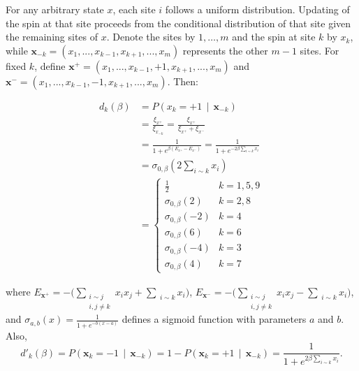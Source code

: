 \documentclass[twoside]{article}
\begin{document}
For any arbitrary state $x$, each site $i$ follows a uniform distribution. Updating of the spin at that site proceeds from the conditional distribution of that site given the remaining sites of $x$. Denote the sites by $1,\ldots,m$ and the spin at site $k$ by $x_k$, while ${\boldsymbol{x}}_{-k}=\left( x_1,...,x_{k-1},x_{k+1},...,x_m \right)$ represents the other $m-1$ sites. For fixed $k$, define ${\boldsymbol{x}}^+=\left( x_1,...,x_{k-1},+1, x_{k+1},...,x_m \right)$ and ${\boldsymbol{x}}^-=\left(x_1,...,x_{k-1},-1,x_{k+1},...,x_m \right)$. Then:
\begin{small}
\begin{align*}
d_k(\beta) &= P\left( x_k = +1 \,\middle|\, \boldsymbol{x}_{-k} \right) \\
&= \frac{\xi_{x^+}}{\xi_{x_{-k}}} = \frac{\xi_{x^+}}{\xi_{x^+} + \xi_{x^-}} \\
&=\frac{1}{1 + e^{\beta \left( E_{x^+} - E_{x^-} \right)}} = \frac{1}{1 + e^{-2\beta \sum\nolimits_{i \sim k} x_i}} \\
&= {\sigma }_{0 ,\beta} (2\sum\nolimits_{i \sim k} x_i) \\
&= \begin{cases}
    \frac{1}{2} & k = 1, 5, 9 \\
   {\sigma }_{0 ,\beta}(2) & k = 2, 8 \\
     {\sigma }_{0 ,\beta}(-2) & k = 4 \\
      {\sigma }_{0 ,\beta}(6) & k = 6 \\
     {\sigma }_{0 ,\beta}(-4) & k = 3 \\
     {\sigma }_{0 ,\beta}(4) & k = 7
\end{cases}
\end{align*}
\end{small}
where ${{E}_{{{\boldsymbol{x}}^{+}}}}=-\Big( \sum\nolimits_{\begin{smallmatrix} i\sim j \\ i,j\ne k \end{smallmatrix}}^{{}}{{{x}_{i}}{{x}_{j}}}+\sum\nolimits_{\,\,\,i\sim k}{{{x}_{i}}} \Big)$, ${{E}_{{{\boldsymbol{x}}^{-}}}}=-\Big( \sum\nolimits_{\begin{smallmatrix} i\sim j \\ i,j\ne k \end{smallmatrix}}^{{}}{{{x}_{i}}{{x}_{j}}}-\sum\nolimits_{\,\,\,i\sim k}{{{x}_{i}}} \Big)$, and ${\sigma }_{a ,b }( x )=\frac{1}{1+{{e}^{-b ( x-a )}}}$ defines a sigmoid function with parameters $a$ and $b$. Also,
\[d'_k(\beta) = P\left( \boldsymbol{x}_k = -1 \,\middle|\, \boldsymbol{x}_{-k} \right) = 1 - P\left(\boldsymbol{x}_k = +1 \,\middle|\, \boldsymbol{x}_{-k} \right) = \frac{1}{1 + e^{2\beta \sum\nolimits_{i \sim k} x_i}}.\]
\end{document}

